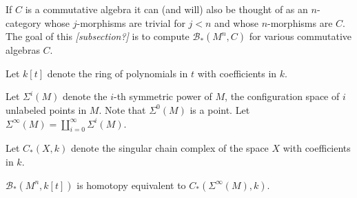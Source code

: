 \documentclass[11pt,leqno]{amsart}
\def\bc{{\mathcal B}}
\def\nn#1{{{\it \small [#1]}}}
\begin{document}
If $C$ is a commutative algebra it
can (and will) also be thought of as an $n$-category whose $j$-morphisms are trivial for
$j<n$ and whose $n$-morphisms are $C$. 
The goal of this \nn{subsection?} is to compute
$\bc_*(M^n, C)$ for various commutative algebras $C$.

Let $k[t]$ denote the ring of polynomials in $t$ with coefficients in $k$.

Let $\Sigma^i(M)$ denote the $i$-th symmetric power of $M$, the configuration space of $i$
unlabeled points in $M$.
Note that $\Sigma^0(M)$ is a point.
Let $\Sigma^\infty(M) = \coprod_{i=0}^\infty \Sigma^i(M)$.

Let $C_*(X, k)$ denote the singular chain complex of the space $X$ with coefficients in $k$.

\begin{prop}
$\bc_*(M^n, k[t])$ is homotopy equivalent to $C_*(\Sigma^\infty(M), k)$.
\end{prop}
\end{document}
